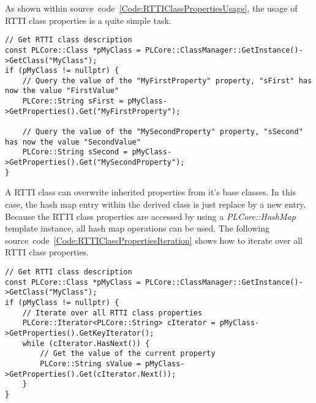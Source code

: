 As shown within source~code~\ref{Code:RTTIClassPropertiesUsage}, the usage of \ac{RTTI} class properties is a quite simple task.
\begin{lstlisting}[float=htb,label=Code:RTTIClassPropertiesUsage,caption={Accessing \ac{RTTI} class properties}]
// Get RTTI class description
const PLCore::Class *pMyClass = PLCore::ClassManager::GetInstance()->GetClass("MyClass");
if (pMyClass != nullptr) {
	// Query the value of the "MyFirstProperty" property, "sFirst" has now the value "FirstValue"
	PLCore::String sFirst = pMyClass->GetProperties().Get("MyFirstProperty");

	// Query the value of the "MySecondProperty" property, "sSecond" has now the value "SecondValue"
	PLCore::String sSecond = pMyClass->GetProperties().Get("MySecondProperty");
}
\end{lstlisting}
A \ac{RTTI} class can overwrite inherited properties from it's base classes. In this case, the hash map entry within the derived class is just replace by a new entry. Because the \ac{RTTI} class properties are accessed by using a \emph{PLCore::HashMap} template instance, all hash map operations can be used. The following source~code~\ref{Code:RTTIClassPropertiesIteration} shows how to iterate over all \ac{RTTI} class properties.
\begin{lstlisting}[float=htb,label=Code:RTTIClassPropertiesIteration,caption={Iterating over all \ac{RTTI} class properties}]
// Get RTTI class description
const PLCore::Class *pMyClass = PLCore::ClassManager::GetInstance()->GetClass("MyClass");
if (pMyClass != nullptr) {
	// Iterate over all RTTI class properties
	PLCore::Iterator<PLCore::String> cIterator = pMyClass->GetProperties().GetKeyIterator();
	while (cIterator.HasNext()) {
		// Get the value of the current property
		PLCore::String sValue = pMyClass->GetProperties().Get(cIterator.Next());
	}
}
\end{lstlisting}
